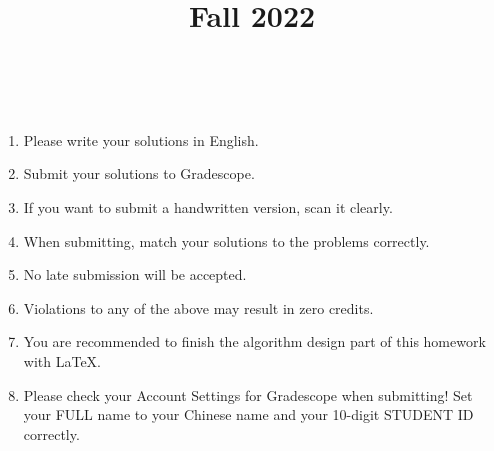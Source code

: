 \documentclass[11pt, addpoints, answers]{exam}
\title{
	\CourseName\\
	Fall 2022\\
	\HomeworkNO\\
}
\author{}
\date{\DueDate}
\begin{document}
\maketitle

\begin{enumerate}
	\item Please write your solutions in English.
	\item Submit your solutions to Gradescope.
	\item If you want to submit a handwritten version, scan it clearly.
	\item When submitting, match your solutions to the problems correctly.
	\item No late submission will be accepted.
	\item Violations to any of the above may result in zero credits.
	\item You are recommended to finish the algorithm design part of this homework with \LaTeX.
	\item Please check your Account Settings for Gradescope when submitting! Set your FULL name to your Chinese name and your 10-digit STUDENT ID correctly.
\end{enumerate}

\newpage

\renewcommand{\P}{\mathbf{\operatorname{P}}}
\newcommand{\NP}{\mathbf{\operatorname{NP}}}
\newcommand{\NPC}{\mathbf{\operatorname{NP-Complete}}}
\newcommand{\NPH}{\mathbf{\operatorname{NP-Hard}}}

\begin{questions}
	
	\newpage

	
	\newpage

	
	\newpage

	

\end{questions}
\end{document}
